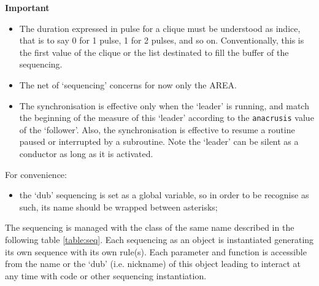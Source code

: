  \begin{notes}

{\large \textbf{Important}}

\begin{itemize}

\item The duration expressed in pulse for a clique must be understood as indice, that is to say 0 for 1 pulse, 1 for 2 pulses, and so on. Conventionally, this is the first value of the clique or the list destinated to fill the buffer of the sequencing.

\item The  net of  `sequencing'  concerns for now only the AREA.
 
\item The synchronisation is effective only when the `leader' is running, and match the beginning of the measure of this `leader' according to the \texttt{anacrusis} value of the `follower'. Also, the synchronisation is effective to resume a routine paused or interrupted by a subroutine. Note the `leader' can be silent as a conductor as long as it is activated.
 
\end{itemize}

\hrulefill 

For convenience:
\begin{itemize}

\item the `dub' sequencing is set as a global variable, so in order to be recognise as such, its name should be wrapped between asterisks;

 
\end{itemize}

\end{notes}

\bigskip

The sequencing is managed with the class of the same name described in the following table \ref{table:seq}. Each sequencing as an object is instantiated generating its own sequence with its own rule(s). Each parameter and function is accessible from the name or the `dub' (i.e. nickname) of this object leading to interact at any time with code or other sequencing instantiation.

\bigskip

